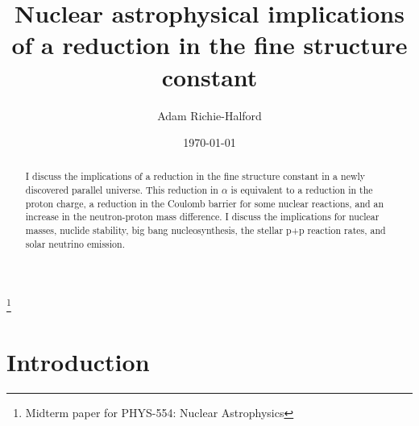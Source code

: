 \documentclass[%
 reprint,
 amsmath,amssymb,
 aps,
]{revtex4-1}
\begin{document}

\title{Nuclear astrophysical implications of a reduction in the fine structure constant}%
\thanks{Midterm paper for PHYS-554: Nuclear Astrophysics}%

\author{Adam Richie-Halford}

\date{\today}%

\begin{abstract}
I discuss the implications of a reduction in the fine structure constant in a newly discovered parallel universe. This reduction in $\alpha$ is equivalent to a reduction in the proton charge, a reduction in the Coulomb barrier for some nuclear reactions, and an increase in the neutron-proton mass difference. I discuss the implications for nuclear masses, nuclide stability, big bang nucleosynthesis, the stellar p+p reaction rates, and solar neutrino emission.
\end{abstract}

\maketitle


\section{\label{sec:intro}Introduction}
\end{document}
